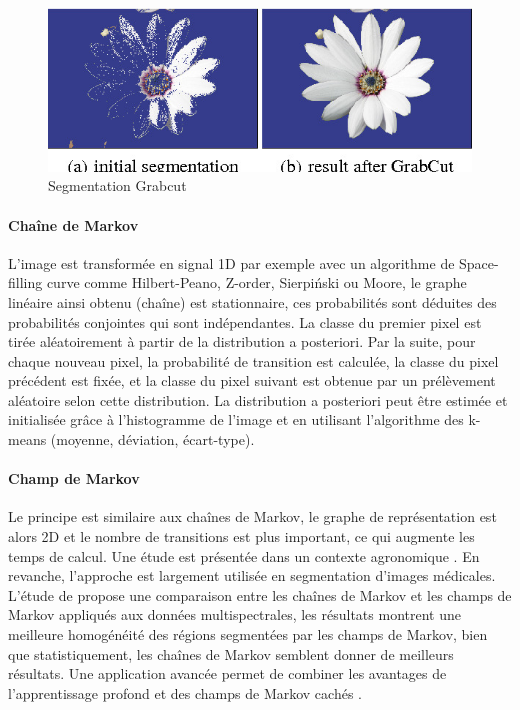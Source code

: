 \documentclass[../thesis.tex]{subfiles}
\begin{document}
    \begin{figure}[H]
        \centering
        \includegraphics[width=0.55\linewidth]{img/biblio/segmentation-grabcut}
        \caption{Segmentation Grabcut}
        \label{fig:03-segmentation-grabcut}
    \end{figure}
    
    \newpage
    \paragraph{Chaîne de Markov} \cite{derrode2003segmentation} L'image est transformée en signal 1D par exemple avec un algorithme de \og Space-filling curve \fg comme Hilbert-Peano, Z-order, Sierpiński ou Moore, le graphe linéaire ainsi obtenu (chaîne) est stationnaire, ces probabilités sont déduites des probabilités conjointes qui sont indépendantes. La classe du premier pixel est tirée aléatoirement à partir de la distribution a posteriori. Par la suite, pour chaque nouveau pixel, la probabilité de transition est calculée, la classe du pixel précédent est fixée, et la classe du pixel suivant est obtenue par un prélèvement aléatoire selon cette distribution. La distribution a posteriori peut être estimée et initialisée grâce à l'histogramme de l'image et en utilisant l'algorithme des k-means (moyenne, déviation, écart-type).
    
    \paragraph{Champ de Markov} \cite{rechid2011segmentation} Le principe est similaire aux chaînes de Markov, le graphe de représentation est alors 2D et le nombre de transitions est plus important, ce qui augmente les temps de calcul. Une étude est présentée dans un contexte agronomique \cite{Yue2016}. En revanche, l'approche est largement utilisée en segmentation d'images médicales. L'étude de \cite{Salzenstein2006FuzzyMR} propose une comparaison entre les chaînes de Markov et les champs de Markov appliqués aux données multispectrales, les résultats montrent une meilleure homogénéité des régions segmentées par les champs de Markov, bien que statistiquement, les chaînes de Markov semblent donner de meilleurs résultats. Une application avancée permet de combiner les avantages de l'apprentissage profond et des champs de Markov cachés \cite{DBLP:journals/corr/LiuLLLT16}.
    
\end{document}
